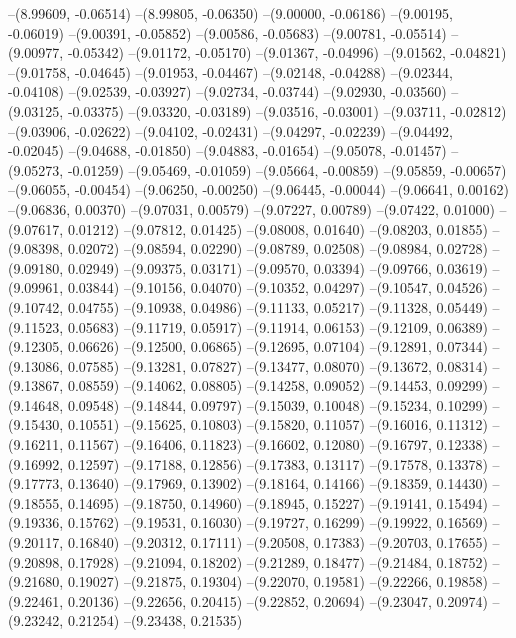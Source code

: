 --(8.99609, -0.06514)
--(8.99805, -0.06350)
--(9.00000, -0.06186)
--(9.00195, -0.06019)
--(9.00391, -0.05852)
--(9.00586, -0.05683)
--(9.00781, -0.05514)
--(9.00977, -0.05342)
--(9.01172, -0.05170)
--(9.01367, -0.04996)
--(9.01562, -0.04821)
--(9.01758, -0.04645)
--(9.01953, -0.04467)
--(9.02148, -0.04288)
--(9.02344, -0.04108)
--(9.02539, -0.03927)
--(9.02734, -0.03744)
--(9.02930, -0.03560)
--(9.03125, -0.03375)
--(9.03320, -0.03189)
--(9.03516, -0.03001)
--(9.03711, -0.02812)
--(9.03906, -0.02622)
--(9.04102, -0.02431)
--(9.04297, -0.02239)
--(9.04492, -0.02045)
--(9.04688, -0.01850)
--(9.04883, -0.01654)
--(9.05078, -0.01457)
--(9.05273, -0.01259)
--(9.05469, -0.01059)
--(9.05664, -0.00859)
--(9.05859, -0.00657)
--(9.06055, -0.00454)
--(9.06250, -0.00250)
--(9.06445, -0.00044)
--(9.06641, 0.00162)
--(9.06836, 0.00370)
--(9.07031, 0.00579)
--(9.07227, 0.00789)
--(9.07422, 0.01000)
--(9.07617, 0.01212)
--(9.07812, 0.01425)
--(9.08008, 0.01640)
--(9.08203, 0.01855)
--(9.08398, 0.02072)
--(9.08594, 0.02290)
--(9.08789, 0.02508)
--(9.08984, 0.02728)
--(9.09180, 0.02949)
--(9.09375, 0.03171)
--(9.09570, 0.03394)
--(9.09766, 0.03619)
--(9.09961, 0.03844)
--(9.10156, 0.04070)
--(9.10352, 0.04297)
--(9.10547, 0.04526)
--(9.10742, 0.04755)
--(9.10938, 0.04986)
--(9.11133, 0.05217)
--(9.11328, 0.05449)
--(9.11523, 0.05683)
--(9.11719, 0.05917)
--(9.11914, 0.06153)
--(9.12109, 0.06389)
--(9.12305, 0.06626)
--(9.12500, 0.06865)
--(9.12695, 0.07104)
--(9.12891, 0.07344)
--(9.13086, 0.07585)
--(9.13281, 0.07827)
--(9.13477, 0.08070)
--(9.13672, 0.08314)
--(9.13867, 0.08559)
--(9.14062, 0.08805)
--(9.14258, 0.09052)
--(9.14453, 0.09299)
--(9.14648, 0.09548)
--(9.14844, 0.09797)
--(9.15039, 0.10048)
--(9.15234, 0.10299)
--(9.15430, 0.10551)
--(9.15625, 0.10803)
--(9.15820, 0.11057)
--(9.16016, 0.11312)
--(9.16211, 0.11567)
--(9.16406, 0.11823)
--(9.16602, 0.12080)
--(9.16797, 0.12338)
--(9.16992, 0.12597)
--(9.17188, 0.12856)
--(9.17383, 0.13117)
--(9.17578, 0.13378)
--(9.17773, 0.13640)
--(9.17969, 0.13902)
--(9.18164, 0.14166)
--(9.18359, 0.14430)
--(9.18555, 0.14695)
--(9.18750, 0.14960)
--(9.18945, 0.15227)
--(9.19141, 0.15494)
--(9.19336, 0.15762)
--(9.19531, 0.16030)
--(9.19727, 0.16299)
--(9.19922, 0.16569)
--(9.20117, 0.16840)
--(9.20312, 0.17111)
--(9.20508, 0.17383)
--(9.20703, 0.17655)
--(9.20898, 0.17928)
--(9.21094, 0.18202)
--(9.21289, 0.18477)
--(9.21484, 0.18752)
--(9.21680, 0.19027)
--(9.21875, 0.19304)
--(9.22070, 0.19581)
--(9.22266, 0.19858)
--(9.22461, 0.20136)
--(9.22656, 0.20415)
--(9.22852, 0.20694)
--(9.23047, 0.20974)
--(9.23242, 0.21254)
--(9.23438, 0.21535)

